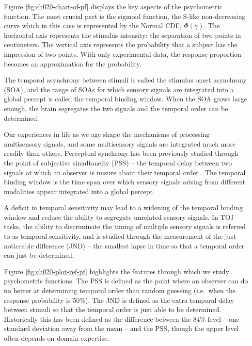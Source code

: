 \documentclass[11pt, oneside, openany]{scrbook}
\begin{document}
Figure \ref{fig:ch020-chart-of-pf} displays the key aspects of the psychometric function. The most crucial part is the sigmoid function, the S-like non-decreasing curve which in this case is represented by the Normal CDF, \(\Phi(\gamma)\). The horizontal axis represents the stimulus intensity: the separation of two points in centimeters. The vertical axis represents the probability that a subject has the impression of two points. With only experimental data, the response proportion becomes an approximation for the probability.

The temporal asynchrony between stimuli is called the stimulus onset asynchrony (SOA), and the range of SOAs for which sensory signals are integrated into a global percept is called the temporal binding window. When the SOA grows large enough, the brain segregates the two signals and the temporal order can be determined.

Our experiences in life as we age shape the mechanisms of processing multisensory signals, and some multisensory signals are integrated much more readily than others. Perceptual synchrony has been previously studied through the point of subjective simultaneity (PSS) -- the temporal delay between two signals at which an observer is unsure about their temporal order \citep{stone2001now}. The temporal binding window is the time span over which sensory signals arising from different modalities appear integrated into a global percept.

A deficit in temporal sensitivity may lead to a widening of the temporal binding window and reduce the ability to segregate unrelated sensory signals. In TOJ tasks, the ability to discriminate the timing of multiple sensory signals is referred to as temporal sensitivity, and is studied through the measurement of the just noticeable difference (JND) -- the smallest lapse in time so that a temporal order can just be determined.

Figure \ref{fig:ch020-plot-ref-pf} highlights the features through which we study psychometric functions. The PSS is defined as the point where an observer can do no better at determining temporal order than random guessing (i.e.~when the response probability is 50\%). The JND is defined as the extra temporal delay between stimuli so that the temporal order is just able to be determined. Historically this has been defined as the difference between the 84\% level -- one standard deviation away from the mean -- and the PSS, though the upper level often depends on domain expertise.
\end{document}
